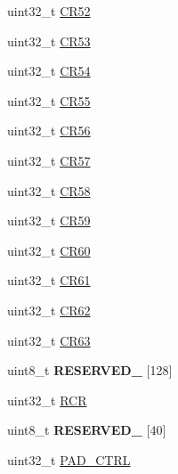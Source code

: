 \begin{DoxyCompactItemize}
\item 
uint32\+\_\+t \hyperlink{struct_d_d_r___mem_map_aab85b60e647d6ff26a53d217b2a63d96}{C\+R52}
\item 
uint32\+\_\+t \hyperlink{struct_d_d_r___mem_map_ac39ce4b302b098a39cf483811b2dd7ee}{C\+R53}
\item 
uint32\+\_\+t \hyperlink{struct_d_d_r___mem_map_a0b6344d64165c3f2360510501654e1da}{C\+R54}
\item 
uint32\+\_\+t \hyperlink{struct_d_d_r___mem_map_a26953eae58da71780cda45c1027fc274}{C\+R55}
\item 
uint32\+\_\+t \hyperlink{struct_d_d_r___mem_map_af2fe2ea08209a795d32fd13e580fc0b8}{C\+R56}
\item 
uint32\+\_\+t \hyperlink{struct_d_d_r___mem_map_a570d957a418225583181a432b9aed5f9}{C\+R57}
\item 
uint32\+\_\+t \hyperlink{struct_d_d_r___mem_map_a88ed266cdaa2d15139e5c836b3ffa220}{C\+R58}
\item 
uint32\+\_\+t \hyperlink{struct_d_d_r___mem_map_a5514954901a16a381f9845054781d61e}{C\+R59}
\item 
uint32\+\_\+t \hyperlink{struct_d_d_r___mem_map_a52c019cf023a9f688f9fdbaf85800fd3}{C\+R60}
\item 
uint32\+\_\+t \hyperlink{struct_d_d_r___mem_map_a216b377b6e1ee9df757fd96723a4ff60}{C\+R61}
\item 
uint32\+\_\+t \hyperlink{struct_d_d_r___mem_map_a51f5fd363a0d54e1c44953de91f0d004}{C\+R62}
\item 
uint32\+\_\+t \hyperlink{struct_d_d_r___mem_map_a14ab276105c6080e182c2f53f33cdcc7}{C\+R63}
\item 
\hypertarget{struct_d_d_r___mem_map_aae387a95852d6194dfca48b4e7b44d00}{}uint8\+\_\+t {\bfseries R\+E\+S\+E\+R\+V\+E\+D\+\_} \mbox{[}128\mbox{]}\label{struct_d_d_r___mem_map_aae387a95852d6194dfca48b4e7b44d00}

\item 
uint32\+\_\+t \hyperlink{struct_d_d_r___mem_map_a46f3bdf0cbb782701ad3edd860cfb667}{R\+C\+R}
\item 
\hypertarget{struct_d_d_r___mem_map_afb50cb0e92d045b308f93b1058a28544}{}uint8\+\_\+t {\bfseries R\+E\+S\+E\+R\+V\+E\+D\+\_} \mbox{[}40\mbox{]}\label{struct_d_d_r___mem_map_afb50cb0e92d045b308f93b1058a28544}

\item 
uint32\+\_\+t \hyperlink{struct_d_d_r___mem_map_abeb11d4cc28f5bb277d0cd4a46cb2ce1}{P\+A\+D\+\_\+\+C\+T\+R\+L}
\end{DoxyCompactItemize}


